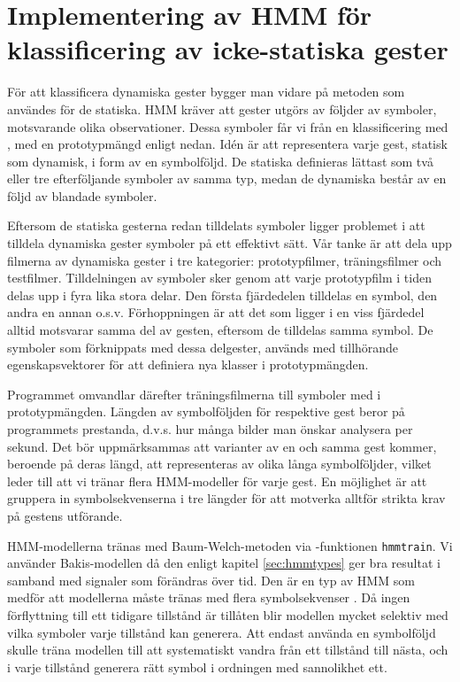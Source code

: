 \documentclass[../rapport_MVEX01-11-05]{subfiles}
\begin{document}
\section{Implementering av HMM för klassificering av icke-statiska gester}
För att klassificera dynamiska gester bygger man vidare på metoden som användes
för de statiska.  HMM kräver att gester utgörs av följder av symboler,
motsvarande olika observationer. Dessa symboler får vi från en 
klassificering med \knn, med en prototypmängd enligt nedan.
Idén är att representera varje gest, statisk som dynamisk, i form av en
symbolföljd.  De statiska definieras lättast som två eller tre efterföljande
symboler av samma typ, medan de dynamiska består av en följd av blandade
symboler.

Eftersom de statiska gesterna redan tilldelats
symboler ligger problemet i att tilldela dynamiska gester symboler på ett effektivt sätt. Vår tanke
är att dela upp filmerna av dynamiska gester i tre kategorier: prototypfilmer, träningsfilmer och 
testfilmer. Tilldelningen av symboler sker genom att varje prototypfilm
i tiden delas upp i fyra lika stora delar. Den 
första fjärdedelen tilldelas en symbol, den andra en annan o.s.v.
Förhoppningen är att det som ligger i en viss fjärdedel alltid motsvarar samma
del av gesten, eftersom de tilldelas samma symbol.
De symboler som förknippats med dessa delgester, används med
tillhörande egenskapsvektorer för att definiera nya klasser i prototypmängden.

Programmet omvandlar därefter träningsfilmerna till symboler med \knn i
prototypmängden.
Längden av 
symbolföljden för respektive gest beror på programmets prestanda, d.v.s. hur många bilder 
man önskar analysera per sekund. Det bör uppmärksammas att varianter av en och samma gest 
kommer, beroende på deras längd, att representeras av olika långa symbolföljder, vilket leder till 
att vi tränar flera HMM-modeller för varje gest. En möjlighet är att gruppera in symbolsekvenserna 
i tre längder för att motverka alltför strikta krav på gestens utförande. 

HMM-modellerna tränas med Baum-Welch-metoden via \MATLAB-funktionen \texttt{hmmtrain}. Vi använder Bakis-modellen 
då den enligt kapitel \ref{sec:hmmtypes}
ger bra resultat i samband med signaler som förändras över tid.
Den är en typ av HMM som medför att
modellerna måste tränas med flera symbolsekvenser \cite{Rabiner89}. Då ingen förflyttning till ett tidigare
tillstånd är tillåten blir modellen mycket selektiv med vilka symboler varje tillstånd kan generera. 
Att endast använda en symbolföljd skulle träna modellen till att systematiskt
vandra från ett tillstånd till nästa,
och i varje tillstånd generera rätt symbol i ordningen med sannolikhet ett. 
\end{document}
